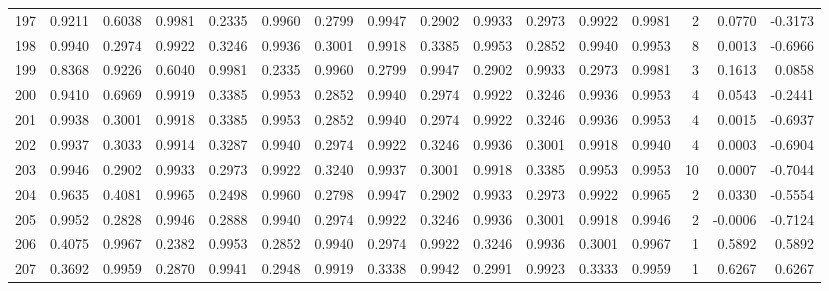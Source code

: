 \begin{tabular}{lrrrrrrrrrrrrrrr}
197 &      0.9211 &  0.6038 &  0.9981 &  0.2335 &  0.9960 &  0.2799 &  0.9947 &  0.2902 &  0.9933 &  0.2973 &   0.9922 &     0.9981 &      2 &                    0.0770 &                    -0.3173 \\
198 &      0.9940 &  0.2974 &  0.9922 &  0.3246 &  0.9936 &  0.3001 &  0.9918 &  0.3385 &  0.9953 &  0.2852 &   0.9940 &     0.9953 &      8 &                    0.0013 &                    -0.6966 \\
199 &      0.8368 &  0.9226 &  0.6040 &  0.9981 &  0.2335 &  0.9960 &  0.2799 &  0.9947 &  0.2902 &  0.9933 &   0.2973 &     0.9981 &      3 &                    0.1613 &                     0.0858 \\
200 &      0.9410 &  0.6969 &  0.9919 &  0.3385 &  0.9953 &  0.2852 &  0.9940 &  0.2974 &  0.9922 &  0.3246 &   0.9936 &     0.9953 &      4 &                    0.0543 &                    -0.2441 \\
201 &      0.9938 &  0.3001 &  0.9918 &  0.3385 &  0.9953 &  0.2852 &  0.9940 &  0.2974 &  0.9922 &  0.3246 &   0.9936 &     0.9953 &      4 &                    0.0015 &                    -0.6937 \\
202 &      0.9937 &  0.3033 &  0.9914 &  0.3287 &  0.9940 &  0.2974 &  0.9922 &  0.3246 &  0.9936 &  0.3001 &   0.9918 &     0.9940 &      4 &                    0.0003 &                    -0.6904 \\
203 &      0.9946 &  0.2902 &  0.9933 &  0.2973 &  0.9922 &  0.3240 &  0.9937 &  0.3001 &  0.9918 &  0.3385 &   0.9953 &     0.9953 &     10 &                    0.0007 &                    -0.7044 \\
204 &      0.9635 &  0.4081 &  0.9965 &  0.2498 &  0.9960 &  0.2798 &  0.9947 &  0.2902 &  0.9933 &  0.2973 &   0.9922 &     0.9965 &      2 &                    0.0330 &                    -0.5554 \\
205 &      0.9952 &  0.2828 &  0.9946 &  0.2888 &  0.9940 &  0.2974 &  0.9922 &  0.3246 &  0.9936 &  0.3001 &   0.9918 &     0.9946 &      2 &                   -0.0006 &                    -0.7124 \\
206 &      0.4075 &  0.9967 &  0.2382 &  0.9953 &  0.2852 &  0.9940 &  0.2974 &  0.9922 &  0.3246 &  0.9936 &   0.3001 &     0.9967 &      1 &                    0.5892 &                     0.5892 \\
207 &      0.3692 &  0.9959 &  0.2870 &  0.9941 &  0.2948 &  0.9919 &  0.3338 &  0.9942 &  0.2991 &  0.9923 &   0.3333 &     0.9959 &      1 &                    0.6267 &                     0.6267 \\

\end{tabular}
